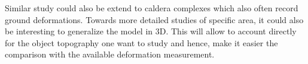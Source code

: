 Similar study  could also  be extend to  caldera complexes  which also
often record  ground deformations.   Towards more detailed  studies of
specific area, it could also be interesting to generalize the model in
$3$D. This  will allow to  account directly for the  object topography
one want  to study and hence,  make it easier the  comparison with the
available deformation measurement.



